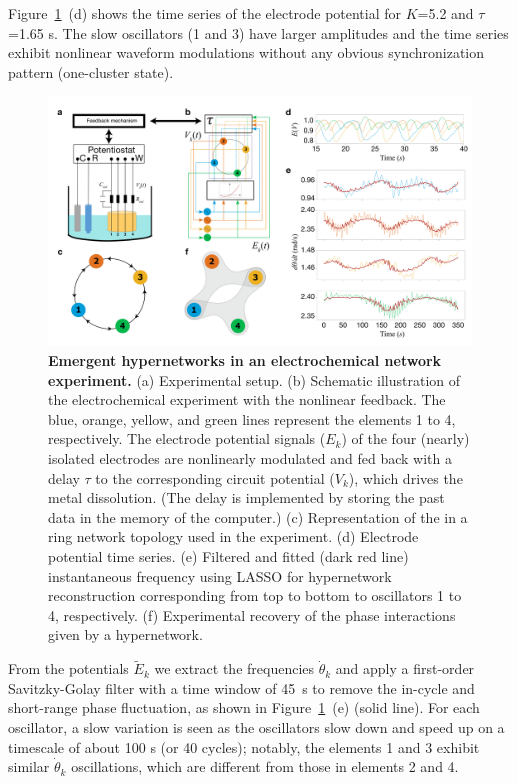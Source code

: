 \documentclass[12pt]{article}
\theoremstyle{plain}
\theoremstyle{definition}
\theoremstyle{remark}
\theoremstyle{remark}
\begin{document}
Figure~\ref{Fig1}~(d) shows the time series of the electrode potential for $K$=5.2 and $\tau$ =1.65 s. The slow  oscillators (1 and 3) have larger amplitudes and the time series exhibit nonlinear waveform modulations  without any obvious synchronization pattern (one-cluster state).  
\begin{figure}[htp]
    \centering
    \includegraphics[width=1\columnwidth]{figure1_3.pdf}
    \caption{{\bf Emergent hypernetworks in an  electrochemical network experiment.} (a) Experimental setup. (b) Schematic illustration of the electrochemical experiment with the nonlinear feedback. The blue, orange, yellow, and green lines represent the elements 1 to 4, respectively. {\color{black}The electrode potential signals ($E_k$) of the four (nearly) isolated electrodes are nonlinearly modulated and fed back with a delay $\tau$ to the corresponding circuit potential ($V_k$), 
    which drives the metal dissolution. (The delay is implemented by storing the past data in the memory of 
    the computer.)  }  (c) Representation of the in a ring network topology used in the experiment.  (d) Electrode potential  time series.  (e) Filtered and fitted (dark red line) instantaneous frequency using LASSO for hypernetwork reconstruction corresponding from top to bottom to oscillators 1 to 4, respectively. (f) Experimental recovery of the phase interactions given by a hypernetwork.
}
\label{Fig1}
\end{figure}

From the potentials $\tilde E_k$ we  extract the  frequencies $\dot{\theta}_k$ and apply a first-order Savitzky-Golay filter with a time window of 45~s to remove the in-cycle  and short-range phase fluctuation, as shown in Figure~\ref{Fig1}~(e) (solid line). For each oscillator, a slow variation is seen as the oscillators slow down and speed up on a timescale of about 100 s (or 40 cycles); notably, the elements  1 and 3 exhibit similar  $\dot{\theta}_k$ oscillations, which are different from those in elements 2 and 4.
 
\end{document}

